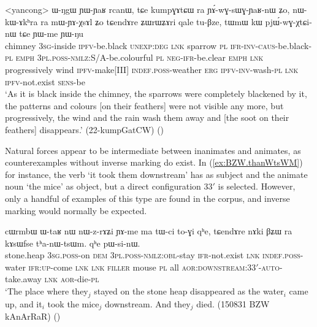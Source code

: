 \begin{exe}
\ex \label{ex:YAwGsWGYARnW} 
\gll <yancong> ɯ-ŋgɯ ɲɯ-ɲaʁ rcanɯ, tɕe kumpɣɤtɕɯ ra ɲɤ́-wɣ-sɯɣ-ɲaʁ-nɯ ʑo, nɯ-kɯ-ɤkʰra ra mɯ-ɲɤ-χsɤl ʑo tɕendɤre ʑɯrɯʑɤri qale tu-βze, tɯmɯ kɯ pjɯ́-wɣ-χtɕi-nɯ tɕe ɲɯ-me ɲɯ-ŋu \\
chimney \textsc{3sg}-inside \textsc{ipfv}-be.black \textsc{unexp}:\textsc{deg} \textsc{lnk} sparrow \textsc{pl} \textsc{ifr}-\textsc{inv}-\textsc{caus}-be.black-\textsc{pl} \textsc{emph} \textsc{3pl}.\textsc{poss}-\textsc{nmlz}:S/A-be.colourful \textsc{pl} \textsc{neg}-\textsc{ifr}-be.clear \textsc{emph} \textsc{lnk} progressively wind \textsc{ipfv}-make[III] \textsc{indef}.\textsc{poss}-weather \textsc{erg} \textsc{ipfv}-\textsc{inv}-wash-\textsc{pl} \textsc{lnk} \textsc{ipfv}-not.exist \textsc{sens}-be \\
\glt `As it is black inside the chimney, the sparrows were completely blackened by it, the patterns and colours [on their feathers] were not visible any more, but progressively, the wind and the rain wash them away and [the soot on their feathers] disappears.' (22-kumpGatCW) ()
 
\end{exe}

Natural forces appear to be intermediate between inanimates and animates, as counterexamples without inverse marking do exist. In (\ref{ex:BZW.thanWtsWM}) for instance, the verb  `it took them downstream' has  as subject and the animate noun  `the mice' as object, but a direct configuration 3\fl{}3$'$ is selected. However, only a handful of examples of this type are found in the corpus, and inverse marking would normally be expected.

\begin{exe}
\ex \label{ex:BZW.thanWtsWM}
\gll cɯrmbɯ ɯ-taʁ nɯ nɯ-z-rɤʑi ɲɤ-me ma tɯ-ci to-ɣi qʰe, tɕendɤre nɤki βʑɯ ra kɤsɯfse tʰa-nɯ-tsɯm. qʰe pɯ-si-nɯ. \\
stone.heap \textsc{3sg}.\textsc{poss}-on \textsc{dem} \textsc{3pl}.\textsc{poss}-\textsc{nmlz}:\textsc{obl}-stay \textsc{ifr}-not.exist \textsc{lnk} \textsc{indef}.\textsc{poss}-water \textsc{ifr}:\textsc{up}-come \textsc{lnk} \textsc{lnk} \textsc{filler} mouse \textsc{pl} all \textsc{aor}:\textsc{downstream}:3\fl{}3$'$-\textsc{auto}-take.away \textsc{lnk} \textsc{aor}-die-\textsc{pl} \\
\glt `The place where they$_j$ stayed on the stone heap disappeared as the water$_i$ came up, and it$_i$ took the mice$_j$ downstream. And they$_j$ died.  (150831 BZW kAnArRaR)
()
\end{exe}

